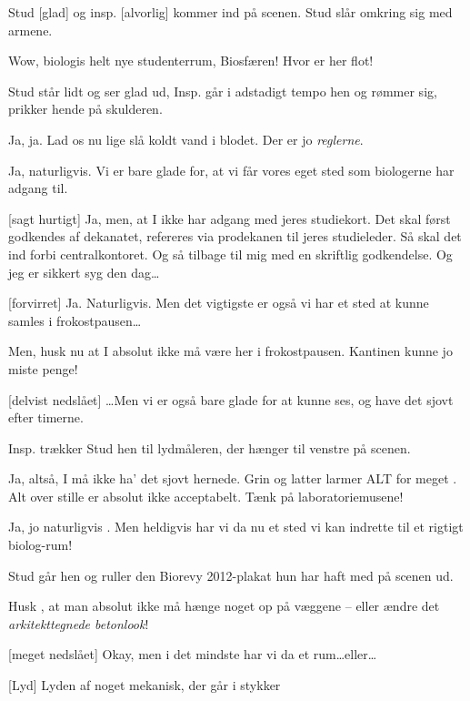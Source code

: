 \documentclass[a4paper,12pt]{article}
\begin{document}
\begin{sketch}

\scene Stud [glad] og insp. [alvorlig] kommer ind på scenen. Stud slår omkring sig med armene.

 Wow, biologis helt nye studenterrum, Biosfæren! Hvor er her flot!

\scene Stud står lidt og ser glad ud, Insp. går i adstadigt tempo hen og rømmer sig, prikker hende på skulderen.

 Ja, ja. Lad os nu lige slå koldt vand i blodet. Der er jo  \emph{reglerne}.

 Ja, naturligvis. Vi er bare glade for, at vi får vores eget sted som biologerne har adgang til.

[sagt hurtigt] Ja, men, at I ikke har adgang med jeres studiekort. Det skal først godkendes af dekanatet, refereres via prodekanen til jeres studieleder. Så skal det ind forbi centralkontoret. Og så tilbage til mig med en skriftlig godkendelse. Og jeg er sikkert syg den dag\ldots

[forvirret] Ja. Naturligvis. Men det vigtigste er også vi har et sted at kunne samles i frokostpausen\ldots

 Men, husk nu at I absolut ikke må være her i frokostpausen. Kantinen kunne jo miste penge!

[delvist nedslået] \ldots Men vi er også bare glade for at kunne ses, og have det sjovt efter timerne.

\scene Insp. trækker Stud hen til lydmåleren, der hænger til venstre på scenen.

 Ja, altså, I må ikke ha' det sjovt hernede. Grin og latter larmer ALT for meget . Alt over stille er absolut ikke acceptabelt. Tænk på laboratoriemusene!

 Ja, jo naturligvis . Men heldigvis har vi da nu et sted vi kan indrette til et rigtigt biolog-rum!

\scene Stud går hen og ruller den Biorevy 2012-plakat hun har haft med på scenen ud.

 Husk , at man absolut ikke må hænge noget op på væggene  -- eller ændre det \emph{arkitekttegnede betonlook}!

[meget nedslået] Okay, men i det mindste har vi da et rum\ldots eller\ldots

[Lyd] Lyden af noget mekanisk, der går i stykker 


\end{sketch}
\end{document}
